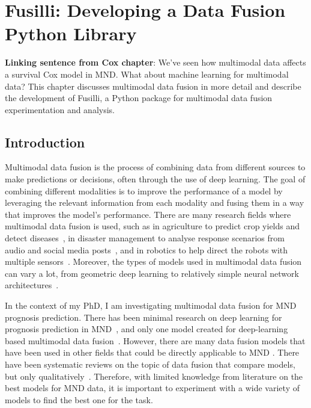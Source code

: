 \chapter{Fusilli: Developing a Data Fusion Python Library}
\label{fusilli_development}

\textbf{Linking sentence from Cox chapter}: 
We've seen how multimodal data affects a survival Cox model in MND.
What about machine learning for multimodal data?
This chapter discusses multimodal data fusion in more detail and describe the development of Fusilli, a Python package for multimodal data fusion experimentation and analysis.

\section{Introduction}

Multimodal data fusion is the process of combining data from different sources to make predictions or decisions, often through the use of deep learning.
The goal of combining different modalities is to improve the performance of a model by leveraging the relevant information from each modality and fusing them in a way that improves the model's performance.
There are many research fields where multimodal data fusion is used, such as in agriculture to predict crop yields and detect diseases~\cite{s.s.gopiMultimodalMachineLearning2023, patilRiceFusionMultimodalityData2022}, in disaster management to analyse response scenarios from audio and social media posts~\cite{algiriyageMultisourceMultimodalData2021}, and in robotics to help direct the robots with multiple sensors~\cite{duanMultimodalSensorsMLBased2022}.
Moreover, the types of models used in multimodal data fusion can vary a lot, from geometric deep learning to relatively simple neural network architectures~\cite{cuiDeepMultimodalFusion2022}.

In the context of my PhD, I am investigating multimodal data fusion for MND prognosis prediction.
There has been minimal research on deep learning for prognosis prediction in MND~\cite{pancottiDeepLearningMethods2022, mullerExplainableModelsDisease2021}, and only one model created for deep-learning based multimodal data fusion~\cite{vanderburghDeepLearningPredictions2017}.
However, there are many data fusion models that have been used in other fields that could be directly applicable to MND .
There have been systematic reviews on the topic of data fusion that compare models, but only qualitatively~\cite{cuiDeepMultimodalFusion2022, gaoSurveyDeepLearning2020, stahlschmidtMultimodalDeepLearning2022, yanDeepMultiviewLearning2021}.
Therefore, with limited knowledge from literature on the best models for MND data, it is important to experiment with a wide variety of models to find the best one for the task.


